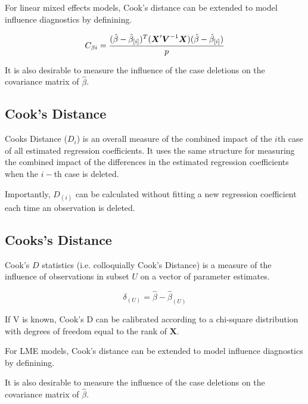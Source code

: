 \documentclass[Main.tex]{subfiles}
\begin{document}
		For linear mixed effects models, Cook's distance can be extended to model influence diagnostics by definining.
		
		\[ C_{\beta i} = {(\hat{\beta} - \hat{\beta}_{[i]})^{T}(\boldsymbol{X}^{\prime}\boldsymbol{V}^{-1}\boldsymbol{X}) (\hat{\beta} - \hat{\beta}_{[i]}) \over p}\]
		
		It is also desirable to measure the influence of the case deletions on the covariance matrix of $\hat{\beta}$.
		
		
		
		
		
		
	\subsection*{Cook's Distance}%
	Cooks Distance ($D_{i}$) is an overall measure of the combined impact of the $i$th case of all estimated regression coefficients. It uses the same structure for measuring the combined impact of the differences in the estimated regression coefficients when the $i-$th case is deleted.
	
	Importantly, $D_{(i)}$ can be calculated without fitting a new regression coefficient each time an observation is deleted.
	
	
	
	\subsection{Cooks's Distance}%
	 Cook's $D$ statistics (i.e. colloquially Cook's Distance) is a measure of the influence of observations in subset $U$ on a vector of parameter estimates.
	
	\[ \delta_{(U)} = \hat{\beta} - \hat{\beta}_{(U)}\]
	
	If V is known, Cook's D can be calibrated according to a chi-square distribution with degrees of freedom equal to the rank of $\boldsymbol{X}$.
	
	
	
	
	For LME models, Cook's distance can be extended to model influence diagnostics by definining.
	
	
	It is also desirable to measure the influence of the case deletions on the covariance matrix of $\hat{\beta}$.
	
\end{document}
